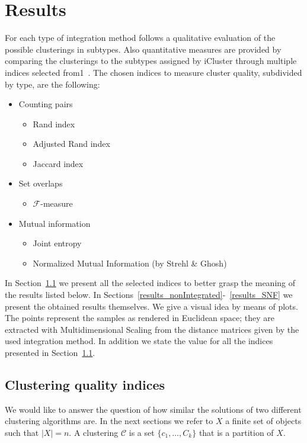 \chapter{Results}
For each type of integration method follows a qualitative evaluation of the possible clusterings in subtypes. Also quantitative measures are provided by comparing the clusterings to the subtypes assigned by iCluster through multiple indices selected from1~\cite{wagner2007comparing}. The chosen indices to measure cluster quality, subdivided by type, are the following:
\begin{itemize}
    \item Counting pairs
    \begin{itemize}             
        \item Rand index
        \item Adjusted Rand index
        \item Jaccard index
    \end{itemize}
    \item Set overlaps
    \begin{itemize}
        \item $\mathcal{F}$-measure
    \end{itemize}
    \item Mutual information
    \begin{itemize}
        \item Joint entropy
        \item Normalized Mutual Information (by Strehl \& Ghosh)
    \end{itemize}
\end{itemize}
In Section~\ref{results_indices} we present all the selected indices to better grasp the meaning of the results listed below. In Sections~\ref{results_nonIntegrated}-~\ref{results_SNF} we present the obtained results themselves. We give a visual idea by means of plots. The points represent the samples as rendered in Euclidean space; they are extracted with Multidimensional Scaling from the distance matrices given by the used integration method. In addition we state the value for all the indices presented in Section~\ref{results_indices}.

\section{Clustering quality indices}\label{results_indices}
We would like to answer the question of how similar the solutions of two different clustering algorithms are. In the next sections we refer to $X$ a finite set of objects such that $|X|=n$. A clustering $\mathcal{C}$ is a set $\{c_1,\dots,C_k\}$ that is a partition of $X$.

